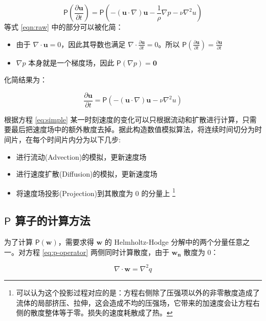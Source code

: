 \documentclass{ctexart}
\begin{document}
\begin{equation}
\label{eqn:raw}
\mathsf{P}(\frac{\partial \mathbf{u}}{\partial t})
= \mathsf{P}(- (\mathbf{u} \cdot \nabla) \mathbf{u} - \frac{1}{\rho} \nabla p - \nu \nabla^2 u)
\end{equation}
等式 \ref{eqn:raw} 中的部分可以被化简：
\begin{itemize}
  \item 由于 $\nabla \cdot \mathbf{u} = 0$，因此其导数也满足 $\nabla \cdot \frac{\partial \mathbf{u}}{\partial t} = 0$。所以 $\mathsf{P}(\frac{\partial \mathbf{u}}{\partial t}) = \frac{\partial \mathbf{u}}{\partial t}$
  \item $\nabla p$ 本身就是一个梯度场，因此 $\mathsf{P} (\nabla p) = \mathbf{0}$
\end{itemize}
化简结果为：

\begin{equation}
\label{eq:simple}
\frac{\partial \mathbf{u}}{\partial t}
= \mathsf{P}(- (\mathbf{u} \cdot \nabla) \mathbf{u} - \nu \nabla^2 u)
\end{equation}

根据方程 \ref{eq:simple} 某一时刻速度的变化可以只根据流动和扩散进行计算，只需要最后把速度场中的额外散度去掉。据此构造数值模拟算法，将连续时间切分为时间片，在每个时间片内分为以下几步:

\begin{itemize}
\item 进行流动(Advection)的模拟，更新速度场
\item 进行速度扩散(Diffusion)的模拟，更新速度场
\item 将速度场投影(Projection)到其散度为 0 的分量上 \footnote{
  可以认为这个投影过程对应的是：方程右侧除了压强项以外的非零散度造成了流体的局部挤压、拉伸，这会造成不均的压强场，它带来的加速度会让方程右侧的散度整体等于零。损失的速度耗散成了热。
}
\end{itemize}

\subsection{$\mathsf{P}$ 算子的计算方法}
\label{sec:p-operator}
为了计算 $\mathsf{P}(\mathbf{w})$，需要求得 $\mathbf{w}$  的 Helmholtz-Hodge 分解中的两个分量任意之一。对方程 \ref{eq:p-operator} 两侧同时计算散度，由于 $\mathbf{w_n}$ 散度为 0：

\begin{equation}
\nabla \cdot \mathbf{w} = \nabla^2 q
\end{equation}
\end{document}
